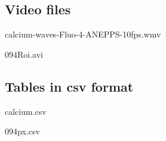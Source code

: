 \documentclass{biophys-new}
\begin{document}
\subsection*{Video files}

calcium-waves-Fluo-4-ANEPPS-10fps.wmv

094Roi.avi

\subsection*{Tables in csv format}

calcium.csv

094px.csv

\end{document}
